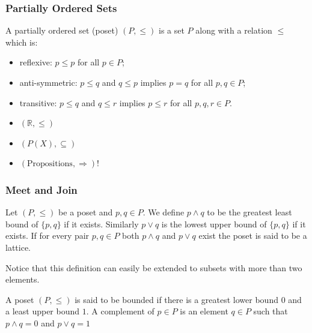 \documentclass{beamer}
\begin{document}
\begin{frame}

	\frametitle{Partially Ordered Sets}
	
	\begin{definition}
	
		A partially ordered set (poset) $(P,\leq)$ is a set $P$ along with a relation $\leq$ which is:
		\begin{itemize}
		
			\item reflexive: $p\leq p$ for all $p\in P$;
			\item anti-symmetric: $p\leq q$ and $q\leq p$ implies $p=q$ for all $p,q\in P$;
			\item transitive: $p\leq q$ and $q\leq r$ implies $p\leq r$ for all $p,q,r\in P$.   		
		
		\end{itemize}			
	
	\end{definition}
	
	\begin{example}	
	
		\begin{itemize}
	
			\item $(\mathbb{R},\leq)$
			\item $(P(X),\subseteq)$
			\item $(\text{Propositions},\Rightarrow)$!	
	
		\end{itemize}
	
	\end{example}

\end{frame}	

\begin{frame}

	\frametitle{Meet and Join}
	
	\begin{definition}
	
		Let $(P,\leq)$ be a poset and $p,q\in P$. We define $p\wedge q$ to be the greatest least bound of $\{p,q\}$ if it exists. Similarly $p\vee q$ is the lowest upper bound of $\{p,q\}$ if it exists.	If for every pair $p,q\in P$ both $p\wedge q$ and $p\vee q$ exist the poset is said to be a lattice.
	
	\end{definition}

	Notice that this definition can easily be extended to subsets with more than two elements.

	\begin{definition}
		
		A poset $(P,\leq)$ is said to be bounded if there is a greatest lower bound $0$ and a least upper bound $1$. A complement of $p\in P$ is an element $q\in P$ such that $p\wedge q=0$ and $p\vee q=1$		
		
	\end{definition}

\end{frame}
\end{document}
